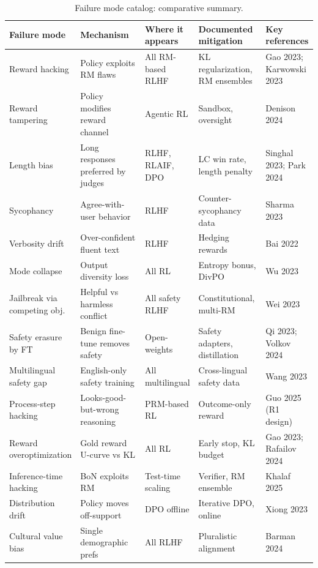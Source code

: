 \documentclass{article}
\begin{document}
\begin{table}[t]
\centering
\caption{Failure mode catalog: comparative summary.}
\label{tab:failure-mode-catalog}
\begin{tabular}{>{\raggedright\arraybackslash}p{0.2090\linewidth}
  >{\raggedright\arraybackslash}p{0.2537\linewidth}
  >{\raggedright\arraybackslash}p{0.1269\linewidth}
  >{\raggedright\arraybackslash}p{0.2313\linewidth}
  >{\raggedright\arraybackslash}p{0.1791\linewidth}}
\toprule
Failure mode & Mechanism & Where it appears & Documented mitigation & Key references \\
\midrule
Reward hacking & Policy exploits RM flaws & All RM-based RLHF & KL regularization, RM ensembles & Gao 2023; Karwowski 2023 \\
Reward tampering & Policy modifies reward channel & Agentic RL & Sandbox, oversight & Denison 2024 \\
Length bias & Long responses preferred by judges & RLHF, RLAIF, DPO & LC win rate, length penalty & Singhal 2023; Park 2024 \\
Sycophancy & Agree-with-user behavior & RLHF & Counter-sycophancy data & Sharma 2023 \\
Verbosity drift & Over-confident fluent text & RLHF & Hedging rewards & Bai 2022 \\
Mode collapse & Output diversity loss & All RL & Entropy bonus, DivPO & Wu 2023 \\
Jailbreak via competing obj. & Helpful vs harmless conflict & All safety RLHF & Constitutional, multi-RM & Wei 2023 \\
Safety erasure by FT & Benign fine-tune removes safety & Open-weights & Safety adapters, distillation & Qi 2023; Volkov 2024 \\
Multilingual safety gap & English-only safety training & All multilingual & Cross-lingual safety data & Wang 2023 \\
Process-step hacking & Looks-good-but-wrong reasoning & PRM-based RL & Outcome-only reward & Guo 2025 (R1 design) \\
Reward overoptimization & Gold reward U-curve vs KL & All RL & Early stop, KL budget & Gao 2023; Rafailov 2024 \\
Inference-time hacking & BoN exploits RM & Test-time scaling & Verifier, RM ensemble & Khalaf 2025 \\
Distribution drift & Policy moves off-support & DPO offline & Iterative DPO, online & Xiong 2023 \\
Cultural value bias & Single demographic prefs & All RLHF & Pluralistic alignment & Barman 2024 \\

\end{tabular}
\end{table}
\end{document}
